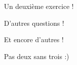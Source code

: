 \begin{exercice}
    Un deuxième exercice !
    \begin{question}[5 points]
        D'autres questions !
    \end{question}
    \begin{question}[5 points]
        Et encore d'autres !
    \end{question}
    \begin{question}[1 bonus]
        Pas deux sans trois :) 
    \end{question}
\end{exercice}
\vspace{1cm}